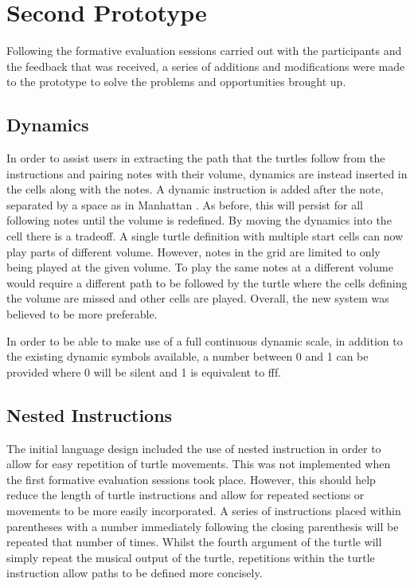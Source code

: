 \section{Second Prototype}

Following the formative evaluation sessions carried out with the participants and the feedback that was received, a series of additions and modifications were made to the prototype to solve the problems and opportunities brought up.

\subsection{Dynamics}

In order to assist users in extracting the path that the turtles follow from the instructions and pairing notes with their volume, dynamics are instead inserted in the cells along with the notes. A dynamic instruction is added after the note, separated by a space as in Manhattan \cite{nash:manhattan}. As before, this will persist for all following notes until the volume is redefined. By moving the dynamics into the cell there is a tradeoff. A single turtle definition with multiple start cells can now play parts of different volume. However, notes in the grid are limited to only being played at the given volume. To play the same notes at a different volume would require a different path to be followed by the turtle where the cells defining the volume are missed and other cells are played. Overall, the new system was believed to be more preferable.

In order to be able to make use of a full continuous dynamic scale, in addition to the existing dynamic symbols available, a number between 0 and 1 can be provided where 0 will be silent and 1 is equivalent to fff.

\subsection{Nested Instructions}

The initial language design included the use of nested instruction in order to allow for easy repetition of turtle movements. This was not implemented when the first formative evaluation sessions took place. However, this should help reduce the length of turtle instructions and allow for repeated sections or movements to be more easily incorporated. A series of instructions placed within parentheses with a number immediately following the closing parenthesis will be repeated that number of times. Whilst the fourth argument of the turtle will simply repeat the musical output of the turtle, repetitions within the turtle instruction allow paths to be defined more concisely.

